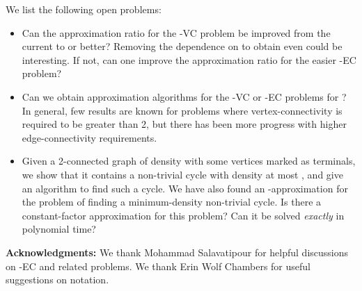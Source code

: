 \documentclass[11pt]{article}
\newcommand{\kec}[1]{-{\sc EC} }
\newcommand{\kvc}[1]{-{\sc VC} }
\newcommand{\ke}{\kec{2}}
\newcommand{\kv}{\kvc{2}}
\begin{document}
We list the following open problems:
\begin{itemize}
\item Can the approximation ratio for the \kv problem be improved from
  the current  to  or better? Removing
  the dependence on  to obtain even  could be
  interesting. If not, can one improve the approximation ratio for the
  easier \ke problem?

\item Can we obtain approximation algorithms for the \kvc{\lambda} or
  \kec{\lambda} problems for ? In general, few results
  are known for problems where vertex-connectivity is required to be
  greater than 2, but there has been more progress with higher
  edge-connectivity requirements.

\item Given a 2-connected graph of density  with some vertices
  marked as terminals, we show that it contains a non-trivial cycle
  with density at most , and give an algorithm to find such a
  cycle. We have also found an -approximation for the
  problem of finding a minimum-density non-trivial cycle. Is there a
  constant-factor approximation for this problem? Can it be solved
  \emph{exactly} in polynomial time?
\end{itemize}

\medskip
\noindent
\textbf{Acknowledgments:} We thank Mohammad Salavatipour for helpful
discussions on \ke and related problems. We thank Erin Wolf Chambers
for useful suggestions on notation.



\end{document}

